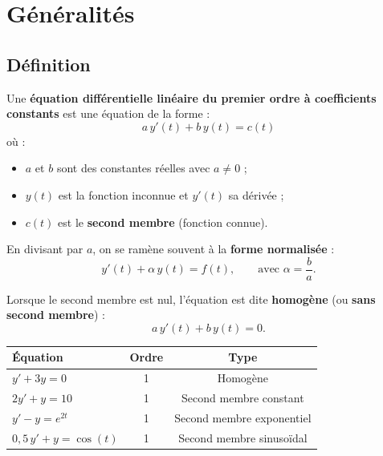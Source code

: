 \documentclass[a4paper,11pt]{article}
\begin{document}
\newpage
\section{Généralités}

\subsection{Définition}

\begin{definition}
Une \textbf{équation différentielle linéaire du premier ordre à coefficients constants} est une équation de la forme :
\[
\boxed{a\,y'(t) + b\,y(t) = c(t)}
\]
où :
\begin{itemize}
  \item $a$ et $b$ sont des constantes réelles avec $a \neq 0$ ;
  \item $y(t)$ est la fonction inconnue et $y'(t)$ sa dérivée ;
  \item $c(t)$ est le \textbf{second membre} (fonction connue).
\end{itemize}
En divisant par $a$, on se ramène souvent à la \textbf{forme normalisée} :
\[
y'(t) + \alpha\,y(t) = f(t), \qquad \text{avec } \alpha = \frac{b}{a}.
\]
\end{definition}

\begin{definition}
Lorsque le second membre est nul, l'équation est dite \textbf{homogène} (ou \textbf{sans second membre}) :
\[
a\,y'(t) + b\,y(t) = 0.
\]
\end{definition}

\begin{exemple}[-- Vocabulaire]
\renewcommand{\arraystretch}{1.4}
\begin{center}
\begin{tabular}{>{\raggedright}p{6.5cm} c c}
\toprule
\textbf{Équation} & \textbf{Ordre} & \textbf{Type} \\
\midrule
$y' + 3y = 0$ & 1 & Homogène \\
$2y' + y = 10$ & 1 & Second membre constant \\
$y' - y = e^{2t}$ & 1 & Second membre exponentiel \\
$0{,}5\,y' + y = \cos(t)$ & 1 & Second membre sinusoïdal \\
\bottomrule
\end{tabular}
\end{center}
\end{exemple}
\end{document}
